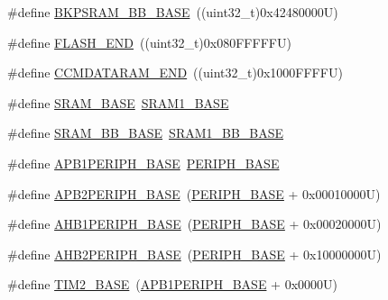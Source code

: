 \begin{DoxyCompactItemize}
\#define \hyperlink{group___peripheral__registers__structures_gaee19a30c9fa326bb10b547e4eaf4e250}{B\+K\+P\+S\+R\+A\+M\+\_\+\+B\+B\+\_\+\+B\+A\+SE}~((uint32\+\_\+t)0x42480000\+U)
\item 
\#define \hyperlink{group___peripheral__registers__structures_ga8be554f354e5aa65370f6db63d4f3ee4}{F\+L\+A\+S\+H\+\_\+\+E\+ND}~((uint32\+\_\+t)0x080\+F\+F\+F\+F\+F\+U)
\item 
\#define \hyperlink{group___peripheral__registers__structures_ga9fbe263946209e6f09faf93512bd2f9a}{C\+C\+M\+D\+A\+T\+A\+R\+A\+M\+\_\+\+E\+ND}~((uint32\+\_\+t)0x1000\+F\+F\+F\+F\+U)
\item 
\#define \hyperlink{group___peripheral__registers__structures_ga05e8f3d2e5868754a7cd88614955aecc}{S\+R\+A\+M\+\_\+\+B\+A\+SE}~\hyperlink{group___peripheral__memory__map_ga7d0fbfb8894012dbbb96754b95e562cd}{S\+R\+A\+M1\+\_\+\+B\+A\+SE}
\item 
\#define \hyperlink{group___peripheral__registers__structures_gad3548b6e2f017f39d399358f3ac98454}{S\+R\+A\+M\+\_\+\+B\+B\+\_\+\+B\+A\+SE}~\hyperlink{group___peripheral__memory__map_gac4c4f61082e4b168f29d9cf97dc3ca5c}{S\+R\+A\+M1\+\_\+\+B\+B\+\_\+\+B\+A\+SE}
\item 
\#define \hyperlink{group___peripheral__registers__structures_ga45666d911f39addd4c8c0a0ac3388cfb}{A\+P\+B1\+P\+E\+R\+I\+P\+H\+\_\+\+B\+A\+SE}~\hyperlink{group___peripheral__memory__map_ga9171f49478fa86d932f89e78e73b88b0}{P\+E\+R\+I\+P\+H\+\_\+\+B\+A\+SE}
\item 
\#define \hyperlink{group___peripheral__registers__structures_ga25b99d6065f1c8f751e78f43ade652cb}{A\+P\+B2\+P\+E\+R\+I\+P\+H\+\_\+\+B\+A\+SE}~(\hyperlink{group___peripheral__memory__map_ga9171f49478fa86d932f89e78e73b88b0}{P\+E\+R\+I\+P\+H\+\_\+\+B\+A\+SE} + 0x00010000\+U)
\item 
\#define \hyperlink{group___peripheral__registers__structures_ga811a9a4ca17f0a50354a9169541d56c4}{A\+H\+B1\+P\+E\+R\+I\+P\+H\+\_\+\+B\+A\+SE}~(\hyperlink{group___peripheral__memory__map_ga9171f49478fa86d932f89e78e73b88b0}{P\+E\+R\+I\+P\+H\+\_\+\+B\+A\+SE} + 0x00020000\+U)
\item 
\#define \hyperlink{group___peripheral__registers__structures_gaeedaa71d22a1948492365e2cd26cfd46}{A\+H\+B2\+P\+E\+R\+I\+P\+H\+\_\+\+B\+A\+SE}~(\hyperlink{group___peripheral__memory__map_ga9171f49478fa86d932f89e78e73b88b0}{P\+E\+R\+I\+P\+H\+\_\+\+B\+A\+SE} + 0x10000000\+U)
\item 
\#define \hyperlink{group___peripheral__registers__structures_ga00d0fe6ad532ab32f0f81cafca8d3aa5}{T\+I\+M2\+\_\+\+B\+A\+SE}~(\hyperlink{group___peripheral__memory__map_ga45666d911f39addd4c8c0a0ac3388cfb}{A\+P\+B1\+P\+E\+R\+I\+P\+H\+\_\+\+B\+A\+SE} + 0x0000\+U)

\end{DoxyCompactItemize}
